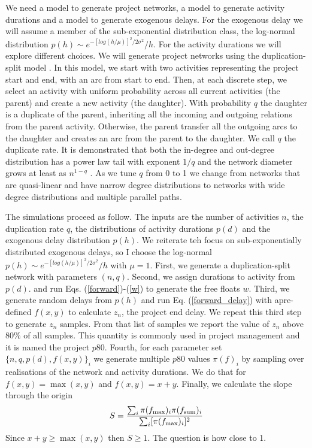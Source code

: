 \documentclass[reprint,aps,prl,amsmath,amssymb,superscriptaddress,showpacs]{revtex4-1}
\begin{document}
We need a model to generate project networks, a model to generate activity durations and a model to generate exogenous delays. For the exogenous delay we will assume a member of the sub-exponential distribution class, the log-normal distribution $p(h)\sim e^{-[log(h/\mu)]^2/2\sigma^2}/h$. For the activity durations we will explore different choices. We will generate project networks using the duplication-split model \cite{vazquez22}. In this model, we start with two activities representing the project start and end, with an arc from start to end. Then, at each discrete step, we select an activity with uniform probability across all current activities (the parent) and create a new activity (the daughter). With probability $q$ the daughter is a duplicate of the parent, inheriting all the incoming and outgoing relations from the parent activity. Otherwise, the parent transfer all the outgoing arcs to the daughter and creates an arc from the parent to the daughter. We call $q$ the duplicate rate.  It is demonstrated that both the in-degree and out-degree distribution has a power law tail with exponent $1/q$ and the network diameter grows at least as $n^{1-q}$ \cite{vazquez22}. As we tune $q$ from 0 to 1 we change from networks that are quasi-linear and have narrow degree distributions to networks with wide degree distributions and multiple parallel paths.

The simulations proceed as follow. The inputs are the number of activities $n$, the duplication rate $q$, the distributions of activity durations $p(d)$ and the exogenous delay distribution $p(h)$. We reiterate teh focus on sub-exponentially distributed exogenous delays, so I choose the log-normal $p(h)\sim e^{-[log(h/\mu)]^2/2\sigma^2}/h$ with $\mu=1$. First, we generate a duplication-split network  with parameters $(n,q)$. Second, we assign durations to activity from $p(d)$. and run Eqs. (\ref{forward})-(\ref{w}) to generate the free floats $w$. Third, we generate random delays from $p(h)$ and run Eq. (\ref{forward_delay}) with apre-defined $f(x,y)$ to calculate $z_n$, the project end delay. We repeat this third step to generate $z_n$ samples. From that list of samples we report the value of $z_n$ above 80\% of all samples. This quantity is commonly used in project management and it is named the project $p80$. Fourth, for each parameter set $\{n,q,p(d),f(x,y)\}_i$ we generate multiple $p80$ values $\pi(f)_i$ by sampling over realisations of the network and activity durations. We do that for $f(x,y)=\max(x,y)$ and $f(x,y)=x+y$. Finally, we calculate the slope through the origin
%
\begin{equation}
S = \frac{ \sum_i \pi(f_{\max})_i \pi(f_{\rm sum})_i }{ \sum_i [\pi(f_{\max})_i]^2 }
\label{slope}
\end{equation}
%
Since $x+y\geq\max(x,y)$ then $S\geq1$. The question is how close to 1.
\end{document}
